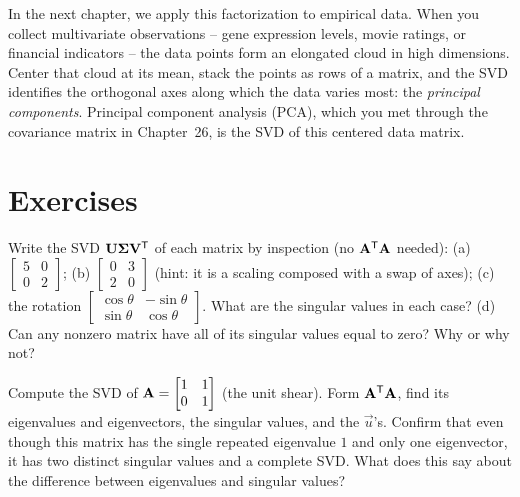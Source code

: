 In the next chapter, we apply this factorization to empirical data. When you collect
multivariate observations -- gene expression levels, movie ratings, or financial
indicators -- the data points form an elongated cloud in high dimensions.
Center that cloud at its mean, stack the points as rows of a matrix, and the SVD
identifies the orthogonal axes along which the data varies most: the
\emph{principal components}. Principal component analysis (PCA), which you met
through the covariance matrix in Chapter~26, is the SVD of this centered data
matrix.

\section{Exercises}
\label{ch29:exercises}

\begin{exercise}
\label{ch29:ex-readoff}
Write the SVD $\mathbf{U}\mathbf{\Sigma}\mathbf{V}^{\mathsf{T}}$ of each matrix by inspection (no
$\mathbf{A}^{\mathsf{T}}\mathbf{A}$ needed):
(a) $\begin{bmatrix} 5 & 0 \\ 0 & 2\end{bmatrix}$;
(b) $\begin{bmatrix} 0 & 3 \\ 2 & 0\end{bmatrix}$ (hint: it is a scaling
composed with a swap of axes);
(c) the rotation $\begin{bmatrix} \cos\theta & -\sin\theta \\ \sin\theta & \cos\theta\end{bmatrix}$.
What are the singular values in each case?
(d) Can any nonzero matrix have all of its singular values equal to zero? Why or why not?
\end{exercise}

\begin{exercise}
\label{ch29:ex-full2x2}
Compute the SVD of $\mathbf{A} = \begin{bmatrix} 1 & 1 \\ 0 & 1\end{bmatrix}$ (the
unit shear). Form $\mathbf{A}^{\mathsf{T}}\mathbf{A}$, find its eigenvalues and eigenvectors, the
singular values, and the $\vec{u}$'s. Confirm that even though this matrix has
the single repeated eigenvalue $1$ and only one eigenvector, it has two distinct
singular values and a complete SVD. What does this say about the difference
between eigenvalues and singular values?
\end{exercise}

